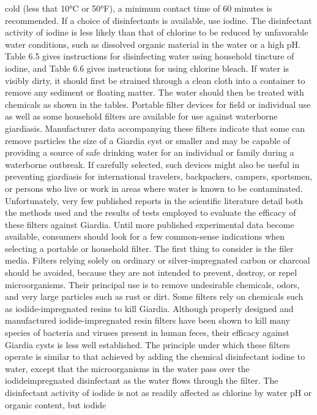 \documentclass{article}
\begin{document}
cold (less that 10°C or 50°F), a minimum contact time of 60 minutes is
recommended. If a choice of disinfectants is available, use iodine. The
disinfectant activity of iodine is less likely than that of chlorine to
be reduced by unfavorable water conditions, such as dissolved organic
material in the water or a high pH. Table 6.5 gives instructions for
disinfecting water using household tincture of iodine, and Table 6.6
gives instructions for using chlorine bleach. If water is visibly dirty,
it should first be strained through a clean cloth into a container to
remove any sediment or floating matter. The water should then be treated
with chemicals as shown in the tables. Portable filter devices for field
or individual use as well as some household filters are available for
use against waterborne giardiasis. Manufacturer data accompanying these
filters indicate that some can remove particles the size of a Giardia
cyst or smaller and may be capable of providing a source of safe
drinking water for an individual or family during a waterborne outbreak.
If carefully selected, such devices might also be useful in preventing
giardiasis for international travelers, backpackers, campers, sportsmen,
or persons who live or work in areas where water is known to be
contaminated. Unfortunately, very few published reports in the
scientific literature detail both the methods used and the results of
tests employed to evaluate the efficacy of these filters against
Giardia. Until more published experimental data become available,
consumers should look for a few common-sense indications when selecting
a portable or household filter. The first thing to consider is the filer
media. Filters relying solely on ordinary or silver-impregnated carbon
or charcoal should be avoided, because they are not intended to prevent,
destroy, or repel microorganisms. Their principal use is to remove
undesirable chemicals, odors, and very large particles such as rust or
dirt. Some filters rely on chemicals such as iodide-impregnated resins
to kill Giardia. Although properly designed and manufactured
iodide-impregnated resin filters have been shown to kill many species of
bacteria and viruses present in human feces, their efficacy against
Giardia cysts is less well established. The principle under which these
filters operate is similar to that achieved by adding the chemical
disinfectant iodine to water, except that the microorganisms in the
water pass over the iodideimpregnated disinfectant as the water flows
through the filter. The disinfectant activity of iodide is not as
readily affected as chlorine by water pH or organic content, but iodide
\end{document}
